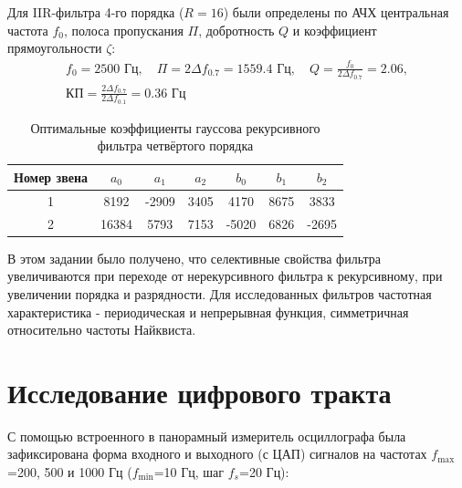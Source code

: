 Для IIR-фильтра 4-го порядка ($R=16$) были определены по АЧХ центральная частота $f_0$, полоса пропускания $\Pi$, добротность $Q$ и коэффициент прямоугольности $\zeta$:
\begin{gather}
  f_0=2500 \text{ Гц}, \quad
  \Pi=2\Delta f_{0.7} =1559.4 \text{ Гц}, \quad
  Q=\frac{f_0}{2\Delta f_{0.7}}=2.06, \\
  \text{КП}=\frac{2\Delta f_{0.7}}{2\Delta f_{0.1}}=0.36 \text{ Гц}
\end{gather}


\begin{table}[H]
\centering
\caption{Оптимальные  коэффициенты  гауссова  рекурсивного  фильтра  четвёртого порядка}
\vspace{0.5em}
\begin{tabular}{|c|c|c|c|c|c|c|}
\hline
Номер звена & $a_0$ & $a_1$ & $a_2$ & $b_0$ & $b_1$ & $b_2$ \\ \hline
1           & 8192    & -2909   & 3405    & 4170    & 8675    & 3833    \\ \hline
2           & 16384   & 5793    & 7153    & -5020   & 6826    & -2695   \\ \hline
\end{tabular}
\end{table}

В этом задании было получено, что селективные свойства фильтра увеличиваются при переходе от нерекурсивного фильтра к рекурсивному, при увеличении порядка и разрядности. Для исследованных фильтров частотная характеристика - периодическая и непрерывная функция, симметричная относительно частоты Найквиста. 




\newpage
\section{Исследование цифрового тракта}

С помощью встроенного в панорамный измеритель осциллографа была зафиксирована форма
входного и выходного (с ЦАП) сигналов на частотах $f_{\max}$=200, 500 и 1000 Гц ($f_{\min}$=10 Гц, шаг $f_s$=20 Гц):

